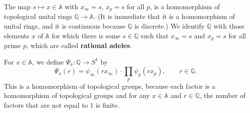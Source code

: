 \documentclass{article}
\theoremstyle{definition}
\theoremstyle{definition}
\begin{document}
The map $s \mapsto x \in \mathbb{A}$ with $x_\infty=s$, $x_p=s$ for all $p$, is a homomorphism
of topological  unital rings $\mathbb{Q} \to \mathbb{A}$. (It is immediate that it is a homomorphism of unital rings, and it is continuous because
$\mathbb{Q}$ is discrete.) We identify $\mathbb{Q}$ with those elements $x$ of $\mathbb{A}$ for which there is some $s \in \mathbb{Q}$
such that $x_\infty=s$ and $x_p=s$ for all prime $p$, which are called \textbf{rational adeles}.


For $x \in \mathbb{A}$, we define $\Psi_x:\mathbb{Q} \to S^1$ by
\[
\Psi_x(r) = \psi_\infty(rx_\infty) \cdot \prod_p \psi_p(rx_p), \qquad r \in \mathbb{Q}.
\]
This is a homomorphism of topological groups, because each factor is a homomorphism of topological groups
 and for any $x \in \mathbb{A}$ and $r \in
\mathbb{Q}$, the number of factors that are not equal to $1$ is finite.
\end{document}
